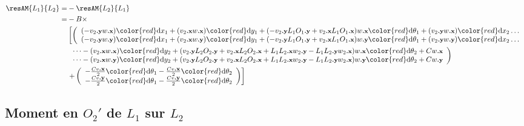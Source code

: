 \documentclass[a4paper,10pt]{article}
\renewcommand{\dx}[1]  {\ensuremath{{\color{red}\text{d}x_{#1}}}}
\renewcommand{\dy}[1]  {\ensuremath{{\color{red}\text{d}y_{#1}}}}
\renewcommand{\dtheta}[1]  {\ensuremath{{\color{red}\text{d}\theta_{#1}}}}
\newcommand{\px}{{\text{\footnotesize\textbf{.x}}}}
\newcommand{\py}{{\text{\footnotesize\textbf{.y}}}}
\begin{document}
        \begin{align*}
            \resAM{L_1}{L_2}=&-\resAM{L_2}{L_1}\\
                    =& -B\times\\
                                &\left[\left(
                                    \begin{array}{l}
                                        (-v_2\py w\px) \dx1 + (v_2\px w\px)\dy1+(-v_2\py L_1O_1\py+v_2\px L_1O_1\px)w\px\dtheta1+(v_2\py w\px)\dx2\dots \\
                                        (-v_2\py w\py) \dx1 + (v_2\px w\py)\dy1+(-v_2\py L_1O_1\py+v_2\px L_1O_1\px) w\py\dtheta1+(v_2\py w\py)\dx2\dots
                                    \end{array}
                                \right.\right.\\
                                &\left.
                                    \begin{array}{l}
                                        \dots-(v_2\px w\px)\dy2+(v_2\py L_2O_2\py+v_2\px L_2O_2\px+L_1L_2\px w_2\py-L_1L_2\py w_2\px) w\px\dtheta2+Cw\px\\
                                        \dots-(v_2\px w\py)\dy2+(v_2\py L_2O_2\py+v_2\px L_2O_2\px+L_1L_2\px w_2\py-L_1L_2\py w_2\px) w\py\dtheta2+Cw\py
                                    \end{array}
                                \right)
                                \\
                                &\left.+\left(
                                    \begin{array}{c}
                                        -\frac{Cv\px}{2}\dtheta1
                                        -\frac{Cv\px}{2}\dtheta2
                                        \\
                                        -\frac{Cv\py}{2}\dtheta1
                                        -\frac{Cv\py}{2}\dtheta2
                                    \end{array}
                                \right)\right]
        \end{align*}


    \subsection{Moment en $O_2'$ de $L_1$ sur $L_2$}
	
\end{document}
